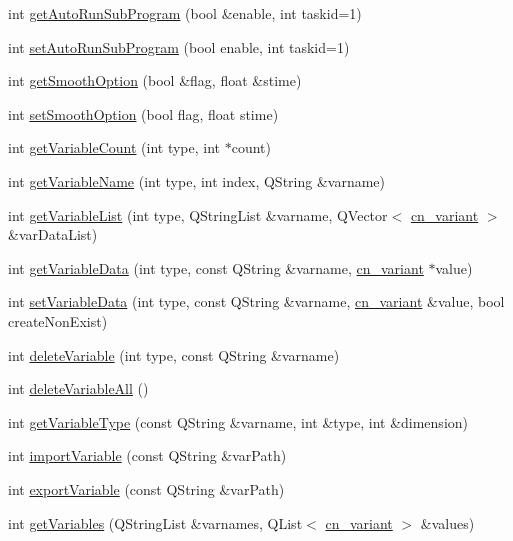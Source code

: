 \begin{DoxyCompactItemize}
\item 
int \hyperlink{classCNRobo_a702a9a6486766d0525860d38c01a13c3}{get\-Auto\-Run\-Sub\-Program} (bool \&enable, int taskid=1)
\item 
int \hyperlink{classCNRobo_a3345f71f5b4dbcd253088f409fc71923}{set\-Auto\-Run\-Sub\-Program} (bool enable, int taskid=1)
\item 
int \hyperlink{classCNRobo_a59a8423196989979ec558516aad2b70c}{get\-Smooth\-Option} (bool \&flag, float \&stime)
\item 
int \hyperlink{classCNRobo_a9d3bf1d41eb94665019eb7d20151f7c4}{set\-Smooth\-Option} (bool flag, float stime)
\item 
int \hyperlink{classCNRobo_a7fbf58c60e0f619078ce73fbda3d9c34}{get\-Variable\-Count} (int type, int $\ast$count)
\item 
int \hyperlink{classCNRobo_aaa6b466815d950b30dd7b6ba3ee03b22}{get\-Variable\-Name} (int type, int index, Q\-String \&varname)
\item 
int \hyperlink{classCNRobo_aa8e1d4c3f3fc05416cf454796add97ee}{get\-Variable\-List} (int type, Q\-String\-List \&varname, Q\-Vector$<$ \hyperlink{structcn__variant}{cn\-\_\-variant} $>$ \&var\-Data\-List)
\item 
int \hyperlink{classCNRobo_a28566b7b247f8bec89c1ca57f4631ee8}{get\-Variable\-Data} (int type, const Q\-String \&varname, \hyperlink{structcn__variant}{cn\-\_\-variant} $\ast$value)
\item 
int \hyperlink{classCNRobo_a4816b780293a13dace528f75a4b951c0}{set\-Variable\-Data} (int type, const Q\-String \&varname, \hyperlink{structcn__variant}{cn\-\_\-variant} \&value, bool create\-Non\-Exist)
\item 
int \hyperlink{classCNRobo_afcc8e4c0ea642cd5f130003f4876aef9}{delete\-Variable} (int type, const Q\-String \&varname)
\item 
int \hyperlink{classCNRobo_aa60970c979f20ed9730aa61dc308deac}{delete\-Variable\-All} ()
\item 
int \hyperlink{classCNRobo_a279910975f53fdbc5bf100653bd47239}{get\-Variable\-Type} (const Q\-String \&varname, int \&type, int \&dimension)
\item 
int \hyperlink{classCNRobo_a274170d197fc479d21c9e566892cb8ec}{import\-Variable} (const Q\-String \&var\-Path)
\item 
int \hyperlink{classCNRobo_a6c667e196239b494328f02a985537ef8}{export\-Variable} (const Q\-String \&var\-Path)
\item 
int \hyperlink{classCNRobo_ad4a41231b7fcaca95825acf3b8a22782}{get\-Variables} (Q\-String\-List \&varnames, Q\-List$<$ \hyperlink{structcn__variant}{cn\-\_\-variant} $>$ \&values)

\end{DoxyCompactItemize}
